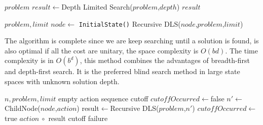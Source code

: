 \documentclass[10pt, letterpaper]{report}
\begin{document}
 \begin{algorithm}
    \caption{Iterative Deepening Search}\label{alg:IDS}
    \begin{algorithmic}
    \Require $problem$
    \State $result\leftarrow$Depth Limited Search($problem$,$depth$)
    \State\Return $result$
    \EndIf
    \EndFor
    \end{algorithmic}
\end{algorithm}

 \begin{algorithm}
    \caption{Depth Limited Search}\label{alg:DLS}
    \begin{algorithmic}
    \Require $problem,limit$
    \State $node\leftarrow$ \texttt{InitialState()}
    \State\Return Recursive DLS($node$,$problem$,$limit$)
    \end{algorithmic}
\end{algorithm}

The algorithm is complete since we are keep searching until a solution is found, is also optimal if all the cost are unitary, the space complexity is $O(bd)$. The time complexity is in $O(b^d)$, this method combines the advantages of breadth-first and depth-first search. It is the preferred blind search method in large state spaces with unknown solution depth.\bigskip

 \begin{algorithm}
    \caption{Recursive DLS}\label{alg:EDLS}
    \begin{algorithmic}
    \Require $n,problem,limit$
    \State\Return empty action sequence
    \EndIf
    \State\Return cutoff
    \EndIf
    \State $cutoffOccurred\leftarrow $false
    \State $n'\leftarrow$ChildNode($node$,$action$)
    \State result$\leftarrow$Recursive DLS($problem$,$n'$)
    \State $cutoffOccurred\leftarrow $true
    \Else
    \State\Return $action \ \circ$ result
    \EndIf
    \EndIf
    \EndFor
    \State\Return cutoff 
    \EndIf
    \State\Return failure
    \end{algorithmic}
\end{algorithm}
\end{document}
